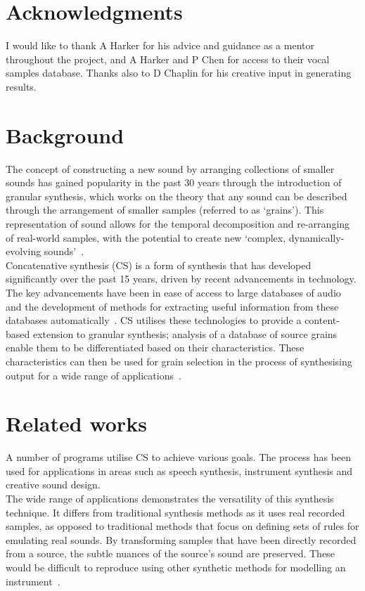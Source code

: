 \documentclass{scrartcl}
\begin{document}
    \section*{Acknowledgments}
    I would like to thank A Harker for his advice and guidance as a mentor
    throughout the project, and A Harker and P Chen for access to their
    vocal samples database.  Thanks also to D Chaplin for his creative input
    in generating results.
    \pagebreak
    
    \section*{Background}
    The concept of constructing a new sound by arranging collections of smaller
    sounds has gained popularity in the past 30 years through the introduction
    of granular synthesis, which works on the theory that any sound can be
    described through the arrangement of smaller samples (referred to as
    `grains'). This representation of sound allows for the temporal
    decomposition and re-arranging of real-world samples, with the potential to
    create new `complex, dynamically-evolving
    sounds'~\parencite[p.1]{Roads1988}.\\

    Concatenative synthesis (CS) is a form of synthesis that has developed
    significantly over the past 15 years, driven by recent advancements in
    technology. The key advancements have been in ease of access to large databases of
    audio and the development of methods for extracting useful information from
    these databases automatically~\parencite[p. 1]{Schwarz2006a}.  CS utilises
    these technologies to provide a content-based extension to granular
    synthesis; analysis of a database of source grains enable them to be 
    differentiated based on their characteristics.  These characteristics can
    then be used for grain selection in the process of synthesising output for
    a wide range of applications~\parencite[p. 102]{Schwarz2007}.

    \section*{Related works}
    A number of programs utilise CS to achieve various goals. The process has
    been used for applications in areas such as speech synthesis, instrument
    synthesis and creative sound design.\\
    The wide range of applications demonstrates the versatility of this
    synthesis technique. It differs from traditional synthesis methods as it
    uses real recorded samples, as opposed to traditional methods that focus on
    defining sets of rules for emulating real sounds. By transforming samples
    that have been directly recorded from a source, the subtle nuances of the
    source's sound are preserved. These would be difficult to reproduce using
    other synthetic methods for modelling an
    instrument~\parencite[p. 24]{Maestre2009}.
\end{document}
